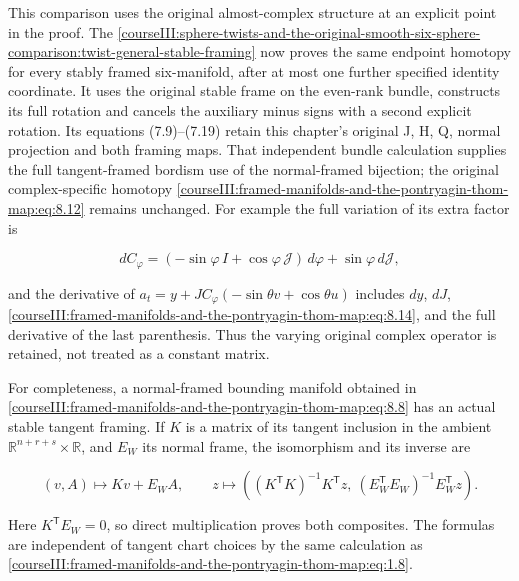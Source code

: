 This comparison uses the original almost-complex structure at an explicit point in the proof. The \cref{courseIII:sphere-twists-and-the-original-smooth-six-sphere-comparison:twist-general-stable-framing} now proves the same endpoint homotopy for every stably framed six-manifold, after at most one further specified identity coordinate. It uses the original stable frame on the even-rank bundle, constructs its full rotation and cancels the auxiliary minus signs with a second explicit rotation. Its equations (7.9)--(7.19) retain this chapter's original J, H, Q, normal projection and both framing maps. That independent bundle calculation supplies the full tangent-framed bordism use of the normal-framed bijection; the original complex-specific homotopy \eqref{courseIII:framed-manifolds-and-the-pontryagin-thom-map:eq:8.12} remains unchanged. For example the full variation of its extra factor is

\begin{equation}
dC_\varphi=
 (-\sin\varphi\,I+\cos\varphi\,\mathcal J)\,d\varphi
                                      +\sin\varphi\,d\mathcal J,
 \label{courseIII:framed-manifolds-and-the-pontryagin-thom-map:eq:8.14}
\end{equation}

and the derivative of \(a_t=y+JC_\varphi(-\sin\theta v+\cos\theta u)\) includes \(dy\), \(dJ\), \eqref{courseIII:framed-manifolds-and-the-pontryagin-thom-map:eq:8.14}, and the full derivative of the last parenthesis. Thus the varying original complex operator is retained, not treated as a constant matrix.

For completeness, a normal-framed bounding manifold obtained in \eqref{courseIII:framed-manifolds-and-the-pontryagin-thom-map:eq:8.8} has an actual stable tangent framing. If \(K\) is a matrix of its tangent inclusion in the ambient \(\mathbb R^{n+r+s}\times\mathbb R\), and \(E_W\) its normal frame, the isomorphism and its inverse are

\begin{equation}
(v,A)\longmapsto Kv+E_WA,\qquad
 z\longmapsto
 \left((K^{\mathsf T}K)^{-1}K^{\mathsf T}z,\
       (E_W^{\mathsf T}E_W)^{-1}E_W^{\mathsf T}z\right).
 \label{courseIII:framed-manifolds-and-the-pontryagin-thom-map:eq:8.15}
\end{equation}

Here \(K^{\mathsf T}E_W=0\), so direct multiplication proves both composites. The formulas are independent of tangent chart choices by the same calculation as \eqref{courseIII:framed-manifolds-and-the-pontryagin-thom-map:eq:1.8}.

